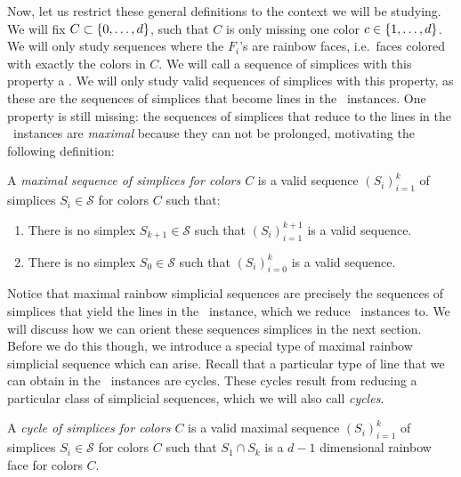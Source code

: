 Now, let us restrict these general definitions to the context we will be studying. We will fix $C \subset \left\{0, \dots, d\right\}$, such that $C$ is only missing one color $c \in \left\{1, \dots, d\right\}$. We will only study sequences where the $F_i$'s are rainbow faces, i.e.~faces colored with exactly the colors in $C$. We will call a sequence of simplices with this property a . We will only study valid sequences of simplices with this property, as these are the sequences of simplices that become lines in the \EndOfLine\ instances. One property is still missing: the sequences of simplices that reduce to the lines in the \EndOfLine\ instances are \emph{maximal} because they can not be prolonged, motivating the following definition:

\begin{definition}
	A \emph{maximal sequence of simplices for colors $C$} is a valid sequence ${\left(S_i\right)}_{i=1}^{k}$ of simplices $S_i \in \mathcal{S}$ for colors $C$ such that:
	\begin{enumerate}
		\item There is no simplex $S_{k+1} \in \mathcal{S}$ such that ${\left(S_i\right)}_{i=1}^{k+1}$ is a valid sequence.
		\item There is no simplex $S_{0} \in \mathcal{S}$ such that ${\left(S_i\right)}_{i=0}^{k}$ is a valid sequence.
	\end{enumerate}
\end{definition}

Notice that maximal rainbow simplicial sequences are precisely the sequences of simplices that yield the lines in the \EndOfLine\ instance, which we reduce \Sperner\ instances to. We will discuss how we can orient these sequences simplices in the next section. Before we do this though, we introduce a special type of maximal rainbow simplicial sequence which can arise. Recall that a particular type of line that we can obtain in the \EndOfLine\ instances are cycles. These cycles result from reducing a particular class of simplicial sequences, which we will also call \emph{cycles}.

\begin{definition}[Cycle]
	A \emph{cycle of simplices for colors $C$} is a valid maximal sequence ${\left(S_i\right)}_{i=1}^{k}$ of simplices $S_i \in \mathcal{S}$ for colors $C$ such that $S_1 \cap S_k$ is a $d-1$ dimensional rainbow face for colors $C$.
\end{definition}

